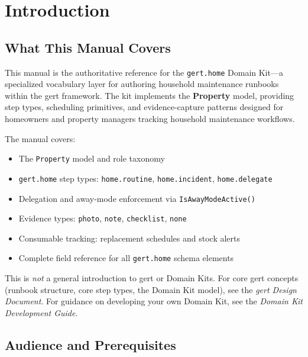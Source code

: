 \chapter{Introduction}
\label{ch:introduction}

\section{What This Manual Covers}
\label{sec:intro-covers}

This manual is the authoritative reference for the \texttt{gert.home} Domain Kit---a
specialized vocabulary layer for authoring household maintenance runbooks within the gert
framework. The kit implements the \textbf{Property} model, providing step types, scheduling
primitives, and evidence-capture patterns designed for homeowners and property managers tracking
household maintenance workflows.

The manual covers:

\begin{itemize}
  \item The \texttt{Property} model and role taxonomy
  \item \texttt{gert.home} step types: \texttt{home.routine},
        \texttt{home.incident}, \texttt{home.delegate}
  \item Delegation and away-mode enforcement via \texttt{IsAwayModeActive()}
  \item Evidence types: \texttt{photo}, \texttt{note}, \texttt{checklist}, \texttt{none}
  \item Consumable tracking: replacement schedules and stock alerts
  \item Complete field reference for all \texttt{gert.home} schema elements
\end{itemize}

This is \emph{not} a general introduction to gert or Domain Kits. For core gert concepts
(runbook structure, core step types, the Domain Kit model), see the \emph{gert Design
Document}. For guidance on developing your own Domain Kit, see the \emph{Domain Kit Development
Guide}.

\section{Audience and Prerequisites}
\label{sec:intro-audience}

